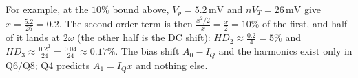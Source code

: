 For example, at the \(10\%\) bound above, \(V_p = 5.2\,\text{mV}\) and
\(nV_T = 26\,\text{mV}\) give \(x = \frac{5.2}{26} = 0.2\). The second order
term is then \(\frac{x^2/2}{x} = \frac{x}{2} = 10\%\) of the first, and half
of it lands at \(2\omega\) (the other half is the DC shift):
\(HD_2 \approx \frac{0.2}{4} = 5\%\) and
\(HD_3 \approx \frac{0.2^2}{24} = \frac{0.04}{24} \approx 0.17\%\).
The bias shift \(A_0 - I_Q\) and the harmonics exist only in Q6/Q8; Q4
predicts \(A_1 = I_Q x\) and nothing else.
